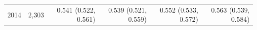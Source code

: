 \begin{tabular}{lrrrrr}
2014 & 2,303 & 0.541 (0.522, 0.561) & 0.539 (0.521, 0.559) & 0.552 (0.533, 0.572) & 0.563 (0.539, 0.584) \\

\end{tabular}
